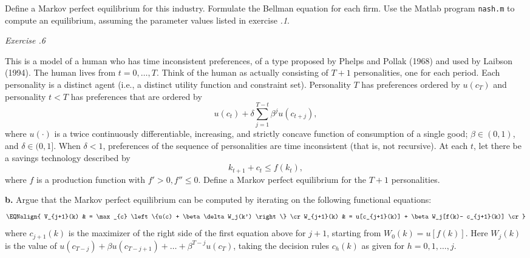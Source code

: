 \medskip
{}  Define a Markov perfect equilibrium for
this industry.
\medskip
{}  Formulate the Bellman equation for each firm.
\medskip
{}  Use the Matlab program {\tt nash.m} to compute
an equilibrium, assuming the parameter values  listed in
exercise {\it \the\chapternum.1\/}. 

\medskip {} 
 
\noindent
{\it Exercise \the\chapternum.6} 

\medskip\noindent
This is a model of a human who  has time inconsistent preferences,
 of a type proposed by Phelps and Pollak (1968) and used by
Laibson (1994).
The human lives from $t=0, \ldots, T$.  Think of the human as
actually consisting of $T+1$  personalities, one for each period.
Each personality is a distinct agent (i.e., a distinct utility
function and constraint set).  Personality $T$ has preferences
ordered by $u(c_T)$ and personality $t < T$
has preferences that are ordered by
$$ u(c_t) + \delta \sum_{j=1}^{T-t} \beta^j u(c_{t+j}), $$ %
where $u(\cdot)$ is a twice continuously differentiable,
increasing, and strictly concave function of consumption of
a single good; $\beta \in (0,1)$, and $\delta \in (0,1]$.  When
$\delta <1$, preferences of the sequence of personalities
are time inconsistent (that is, not recursive).
At each $t$, let there be a savings technology described by
$$ k_{t+1} + c_t \leq f(k_t), $$ %
where $f$ is a production function with $f' >0, f''\leq 0$.
\medskip
{} Define a Markov perfect equilibrium for the
$T+1$ personalities.

\medskip
\noindent
{\bf b.} Argue that the Markov perfect equilibrium can be computed
by iterating on the following functional equations:
$$ \EQNalign{ V_{j+1}(k) & = \max_{c} \left\{u(c) + \beta
            \delta W_j(k') \right\}  \cr %
          W_{j+1}(k) & = u[c_{j+1}(k)] + \beta W_j[f(k)- c_{j+1}(k)] \cr}$$
where $c_{j+1}(k)$ is the maximizer of the right side of
the first equation above  %
for $j+1$, starting from $W_0(k) = u[f(k)]$.
Here $W_j(k)$ is the value of $u(c_{T-j}) + \beta u(c_{T-j+1}) +
\ldots + \beta^{T-j} u(c_T)$, taking the decision
rules $c_h(k)$ as given for $h=0, 1, \ldots, j$.

